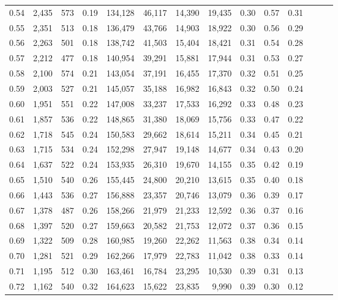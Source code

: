 \begin{tabular}{rrrrrrrrrrrrrr}
0.54 &  2,435 &  573 &  0.19 &  134,128 &   46,117 &  14,390 &  19,435 &  0.30 &  0.57 &      0.31 \\
0.55 &  2,351 &  513 &  0.18 &  136,479 &   43,766 &  14,903 &  18,922 &  0.30 &  0.56 &      0.29 \\
0.56 &  2,263 &  501 &  0.18 &  138,742 &   41,503 &  15,404 &  18,421 &  0.31 &  0.54 &      0.28 \\
0.57 &  2,212 &  477 &  0.18 &  140,954 &   39,291 &  15,881 &  17,944 &  0.31 &  0.53 &      0.27 \\
0.58 &  2,100 &  574 &  0.21 &  143,054 &   37,191 &  16,455 &  17,370 &  0.32 &  0.51 &      0.25 \\
0.59 &  2,003 &  527 &  0.21 &  145,057 &   35,188 &  16,982 &  16,843 &  0.32 &  0.50 &      0.24 \\
0.60 &  1,951 &  551 &  0.22 &  147,008 &   33,237 &  17,533 &  16,292 &  0.33 &  0.48 &      0.23 \\
0.61 &  1,857 &  536 &  0.22 &  148,865 &   31,380 &  18,069 &  15,756 &  0.33 &  0.47 &      0.22 \\
0.62 &  1,718 &  545 &  0.24 &  150,583 &   29,662 &  18,614 &  15,211 &  0.34 &  0.45 &      0.21 \\
0.63 &  1,715 &  534 &  0.24 &  152,298 &   27,947 &  19,148 &  14,677 &  0.34 &  0.43 &      0.20 \\
0.64 &  1,637 &  522 &  0.24 &  153,935 &   26,310 &  19,670 &  14,155 &  0.35 &  0.42 &      0.19 \\
0.65 &  1,510 &  540 &  0.26 &  155,445 &   24,800 &  20,210 &  13,615 &  0.35 &  0.40 &      0.18 \\
0.66 &  1,443 &  536 &  0.27 &  156,888 &   23,357 &  20,746 &  13,079 &  0.36 &  0.39 &      0.17 \\
0.67 &  1,378 &  487 &  0.26 &  158,266 &   21,979 &  21,233 &  12,592 &  0.36 &  0.37 &      0.16 \\
0.68 &  1,397 &  520 &  0.27 &  159,663 &   20,582 &  21,753 &  12,072 &  0.37 &  0.36 &      0.15 \\
0.69 &  1,322 &  509 &  0.28 &  160,985 &   19,260 &  22,262 &  11,563 &  0.38 &  0.34 &      0.14 \\
0.70 &  1,281 &  521 &  0.29 &  162,266 &   17,979 &  22,783 &  11,042 &  0.38 &  0.33 &      0.14 \\
0.71 &  1,195 &  512 &  0.30 &  163,461 &   16,784 &  23,295 &  10,530 &  0.39 &  0.31 &      0.13 \\
0.72 &  1,162 &  540 &  0.32 &  164,623 &   15,622 &  23,835 &   9,990 &  0.39 &  0.30 &      0.12 \\

\end{tabular}
